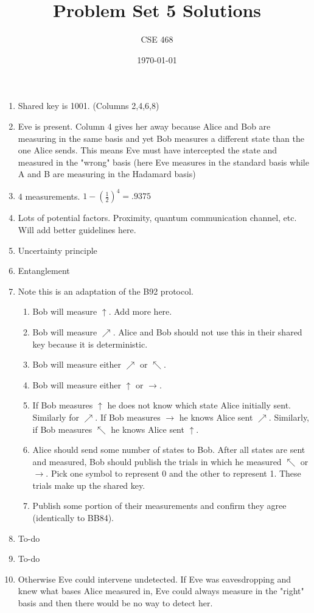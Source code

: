 \documentclass[12pt]{article}
\title{Problem Set 5 Solutions}
\author{CSE 468}
\date{\today}
\begin{document}
\maketitle

\begin{enumerate}[font=\bfseries]
    \item Shared key is 1001. (Columns 2,4,6,8)
    \item Eve is present. Column 4 gives her away because Alice and Bob are measuring in the same basis and yet Bob measures a different state than the one Alice sends. This means Eve must have intercepted the state and measured in the "wrong" basis (here Eve measures in the standard basis while A and B are measuring in the Hadamard basis)
    \item 4 measurements. $1 - (\frac{1}{2})^4 = .9375$
    \item Lots of potential factors. Proximity, quantum communication channel, etc. Will add better guidelines here.
    \item Uncertainty principle
    \item Entanglement
    \item Note this is an adaptation of the B92 protocol.
        \begin{enumerate}
            \item Bob will measure $\uparrow$. Add more here.
            \item Bob will measure $\nearrow$. Alice and Bob should not use this in their shared key because it is deterministic.
            \item Bob will measure either $\nearrow$ or $\nwarrow$.
            \item Bob will measure either $\uparrow$ or $\rightarrow$.
            \item If Bob measures $\uparrow$ he does not know which state Alice initially sent. Similarly for $\nearrow$. If Bob measures $\rightarrow$ he knows Alice sent $\nearrow$. Similarly, if Bob measures $\nwarrow$ he knows Alice sent $\uparrow$.
            \item Alice should send some number of states to Bob.  After all states are sent and measured, Bob should publish the trials in which he measured $\nwarrow$ or $\rightarrow$. Pick one symbol to represent 0 and the other to represent 1. These trials make up the shared key.
            \item Publish some portion of their measurements and confirm they agree (identically to BB84). 
        \end{enumerate}
    \item To-do
    \item To-do
    \item Otherwise Eve could intervene undetected. If Eve was eavesdropping and knew what bases Alice measured in, Eve could always measure in the "right" basis and then there would be no way to detect her.
\end{enumerate}
\end{document}
